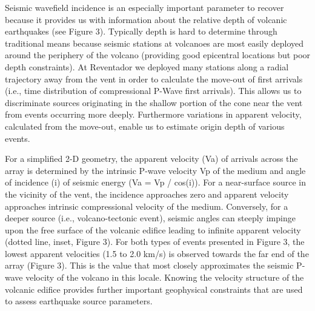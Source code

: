 Seismic wavefield incidence is an especially important parameter to
recover because it provides us with information about the relative
depth of volcanic earthquakes (see Figure 3).  Typically depth is hard
to determine through traditional means because seismic stations at
volcanoes are most easily deployed around the periphery of the volcano
(providing good epicentral locations but poor depth constraints).  At
Reventador we deployed many stations along a radial trajectory away
from the vent in order to calculate the move-out of first arrivals
(i.e., time distribution of compressional P-Wave first arrivals).
This allows us to discriminate sources originating in the shallow
portion of the cone near the vent from events occurring more deeply.
Furthermore variations in apparent velocity, calculated from the
move-out, enable us to estimate origin depth of various events.  

For a simplified 2-D geometry, the apparent velocity (Va) of arrivals
across the array is determined by the intrinsic P-wave velocity Vp of
the medium and angle of incidence (i) of seismic energy (Va = Vp /
cos(i)).  For a near-surface source in the vicinity of the vent, the
incidence approaches zero and apparent velocity approaches intrinsic
compressional velocity of the medium.  Conversely, for a deeper source
(i.e., volcano-tectonic event), seismic angles can steeply impinge
upon the free surface of the volcanic edifice leading to infinite
apparent velocity (dotted line, inset, Figure 3).  For both types of
events presented in Figure 3, the lowest apparent velocities (1.5 to
2.0 km/s) is observed towards the far end of the array (Figure 3).
This is the value that most closely approximates the seismic P-wave
velocity of the volcano in this locale.  Knowing the velocity
structure of the volcanic edifice provides further important
geophysical constraints that are used to assess earthquake source
parameters.

